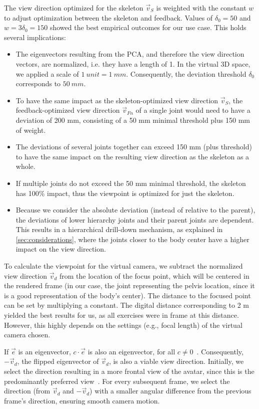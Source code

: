 The view direction optimized for the skeleton \(\vec{v}_S\) is weighted with the constant \(w\) to adjust optimization between the skeleton and feedback. Values of \(\delta_0 = 50\) and \(w = 3\delta_0 = 150\) showed the best empirical outcomes for our use case. This holds several implications:
\begin{itemize}
	\setlength{\itemsep}{-0.3cm}
	\item The eigenvectors resulting from the PCA, and therefore the view direction vectors, are normalized, i.e. they have a length of 1. In the virtual 3D space, we applied a scale of \(1\ unit = 1\ mm\). Consequently, the deviation threshold \(\delta_0\) corresponds to \(50\ mm\).
	\item To have the same impact as the skeleton-optimized view direction \(\vec{v}_S\), the feedback-optimized view direction \(\vec{v}_{Fn}\) of a single joint would need to have a deviation of 200 mm, consisting of a 50 mm minimal threshold plus 150 mm of weight.
	\item The deviations of several joints together can exceed 150 mm (plus threshold) to have the same impact on the resulting view direction as the skeleton as a whole.
	\item If multiple joints do not exceed the 50 mm minimal threshold, the skeleton has 100\% impact, thus the viewpoint is optimized for just the skeleton.
	\item Because we consider the absolute deviation (instead of relative to the parent), the deviations of lower hierarchy joints and their parent joints are dependent. This results in a hierarchical drill-down mechanism, as explained in \autoref{sec:considerations}, where the joints closer to the body center have a higher impact on the view direction.
\end{itemize}

To calculate the viewpoint for the virtual camera, we subtract the normalized view direction \(\vec{v}_d\) from the location of the focus point, which will be centered in the rendered frame (in our case, the joint representing the pelvis location, since it is a good representation of the body's center). The distance to the focused point can be set by multiplying a constant. The digital distance corresponding to 2 m yielded the best results for us, as all exercises were in frame at this distance. However, this highly depends on the settings (e.g., focal length) of the virtual camera chosen.


If \(\vec{e}\) is an eigenvector, \(c \cdot \vec{e}\) is also an eigenvector, for all \(c \neq 0\)~\cite{borisenko}. Consequently, \(-\vec{v}_d\), the flipped eigenvector of \(\vec{v}_d\), is also a viable view direction. Initially, we select the direction resulting in a more frontal view of the avatar, since this is the predominantly preferred view~\cite{zusne1970vpf}. For every subsequent frame, we select the direction (from 
\(\vec{v}_d\) and \(-\vec{v}_d\)) with a smaller angular difference from the previous frame's direction, ensuring smooth camera motion.

